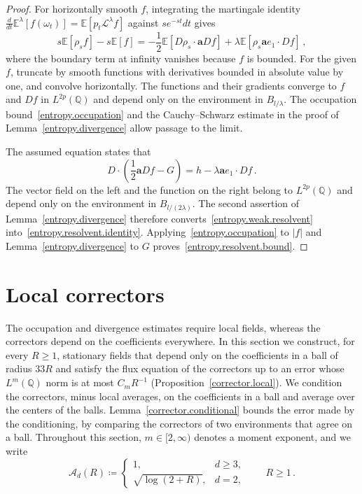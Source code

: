 \documentclass[11pt]{amsart}
\theoremstyle{definition}
\theoremstyle{remark}
\numberwithin{equation}{section}
\newcommand{\E}{\mathbb E}
\newcommand{\Q}{\mathbb Q}
\renewcommand{\a}{\mathbf a}
\newcommand{\cA}{\mathcal A}
\begin{document}
\begin{proof}
For horizontally smooth $f$, integrating the martingale identity $\frac{d}{dt}\mathbb E^\lambda[f(\omega_t)]=\E[p_t\mathcal L^\lambda f]$ against $se^{-st}dt$ gives
\begin{equation}\label{entropy.weak.resolvent}
 s\E[\rho_sf]-s\E[f]
 =-\frac12\E[D\rho_s\cdot\a Df]
   +\lambda\E[\rho_s\a e_1\cdot Df]\, ,
\end{equation}
where the boundary term at infinity vanishes because $f$ is bounded. For the given $f$, truncate by smooth functions with derivatives bounded in absolute value by one, and convolve horizontally. The functions and their gradients converge to $f$ and $Df$ in $L^{2p}(\Q)$ and depend only on the environment in $B_{l/\lambda}$. The occupation bound~\eqref{entropy.occupation} and the Cauchy--Schwarz estimate in the proof of Lemma~\ref{entropy.divergence} allow passage to the limit.

The assumed equation states that
\begin{equation*}
 D\cdot\left(\frac12\a Df-G\right)
 =h-\lambda\a e_1\cdot Df\, .
\end{equation*}
The vector field on the left and the function on the right belong to $L^{2p}(\Q)$ and depend only on the environment in $B_{l/(2\lambda)}$. The second assertion of Lemma~\ref{entropy.divergence} therefore converts~\eqref{entropy.weak.resolvent} into~\eqref{entropy.resolvent.identity}. Applying~\eqref{entropy.occupation} to $|f|$ and Lemma~\ref{entropy.divergence} to $G$ proves~\eqref{entropy.resolvent.bound}.
\end{proof}

\section{Local correctors}\label{sec.correctors}

The occupation and divergence estimates require local fields, whereas the correctors depend on the coefficients everywhere. In this section we construct, for every $R\geq1$, stationary fields that depend only on the coefficients in a ball of radius $33R$ and satisfy the flux equation of the correctors up to an error whose $L^m(\Q)$ norm is at most $C_mR^{-1}$ (Proposition~\ref{corrector.local}). We condition the correctors, minus local averages, on the coefficients in a ball and average over the centers of the balls. Lemma~\ref{corrector.conditional} bounds the error made by the conditioning, by comparing the correctors of two environments that agree on a ball. Throughout this section, $m\in[2,\infty)$ denotes a moment exponent, and we write
\begin{equation}\label{eq.corrector-amplitude}
 \cA_d(R)\coloneqq
 \begin{cases}1,&d\geq3,\\\sqrt{\log(2+R)},&d=2,\end{cases}
 \qquad R\geq1\, .
\end{equation}
\end{document}
